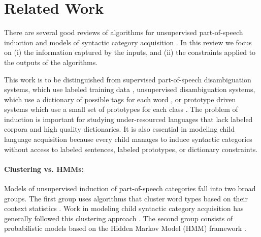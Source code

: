\documentclass[11pt]{article}
\begin{document}
\section{Related Work}
\label{sec:related}

There are several good reviews of algorithms for unsupervised
part-of-speech induction
\cite{Christodoulopoulos:2010:TDU:1870658.1870714,Gao:2008:CBE:1613715.1613761}
and models of syntactic category acquisition \cite{ambridge2011child}.
In this review we focus on (i) the information captured by the inputs,
and (ii) the constraints applied to the outputs of the algorithms.

This work is to be distinguished from supervised part-of-speech
disambiguation systems, which use labeled training data
\cite{Church:1988:SPP:974235.974260}, unsupervised disambiguation
systems, which use a dictionary of possible tags for each word
\cite{Merialdo:1994:TET:972525.972526}, or prototype driven systems
which use a small set of prototypes for each class
\cite{Haghighi:2006:PLS:1220835.1220876}.  The problem of induction is
important for studying under-resourced languages that lack labeled
corpora and high quality dictionaries.  It is also essential in
modeling child language acquisition because every child manages to
induce syntactic categories without access to labeled sentences,
labeled prototypes, or dictionary constraints.

\paragraph{Clustering vs. HMMs:}
Models of unsupervised induction of part-of-speech categories fall
into two broad groups.  The first group uses algorithms that cluster
word types based on their context statistics
\cite{Schutze:1995:DPT:976973.976994}.  Work in modeling child
syntactic category acquisition has generally followed this clustering
approach \cite{redington1998distributional,mintz2003frequent}.  The
second group consists of probabilistic models based on the Hidden
Markov Model (HMM) framework \cite{Brown:1992:CNG:176313.176316}.
\end{document}
